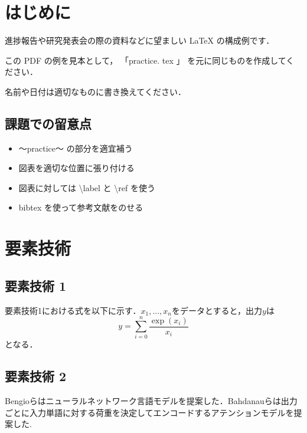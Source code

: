 \documentclass[twocolumn]{jarticle}     %
\begin{document}

\section{はじめに}
進捗報告や研究発表会の際の資料などに望ましい LaTeX の構成例です．

この PDF の例を見本として， 「practice. tex 」 を元に同じものを作成してください．

名前や日付は適切なものに書き換えてください．

\subsection{課題での留意点}
\begin{itemize}

\item 〜practice〜 の部分を適宜補う
\item 図表を適切な位置に張り付ける
\item 図表に対しては \textbackslash label と \textbackslash ref を使う
\item bibtex を使って参考文献をのせる
\end{itemize}

\section{要素技術}

\subsection{要素技術 1 }
要素技術1における式を以下に示す．$x_1, ..., x_n$をデータとすると，出力$y$は
	\begin{equation}
		y = \sum_{i=0}^{n} \frac{\exp{(x_i)}}{x_i}
	\end{equation}
となる．

\subsection{要素技術 2 }
Bengioらはニューラルネットワーク言語モデルを提案した\cite{FFNN}．Bahdanauらは出力ごとに入力単語に対する荷重を決定してエンコードするアテンションモデルを提案した\cite{translate}.
\end{document}
